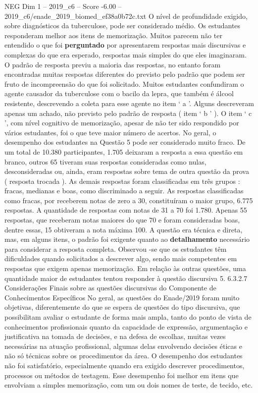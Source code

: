 \begin{textsample}{NEG Dim 1 – 2019\_c6 – Score -6.00 – 2019\_c6/enade\_2019\_biomed\_ef38a0b72c.txt}
O nível de profundidade exigido, sobre diagnósticos da tuberculose, pode ser considerado médio.
Os estudantes responderam melhor aos itens de memorização.
Muitos parecem não ter entendido o que foi \textbf{perguntado} por apresentarem respostas mais discursivas e complexas do que era esperado, respostas mais simples do que eles imaginaram.
O padrão de resposta previu a maioria das respostas, no entanto foram encontradas muitas respostas diferentes do previsto pelo padrão que podem ser fruto de incompreensão do que foi solicitado.
Muitos estudantes confundiram o agente causador da tuberculose com o bacilo da lepra, que também é álcool resistente, descrevendo a coleta para esse agente no item ‘ a ’.
Alguns descreveram apenas um achado, não previsto pelo padrão de resposta ( item ‘ b ’ ).
O item ‘ c ’, com nível cognitivo de memorização, apesar de não ter sido respondido por vários estudantes, foi o que teve maior número de acertos.
No geral, o desempenho dos estudantes na Questão 5 pode ser considerado muito fraco.
De um total de 10.380 participantes, 1.705 deixaram a resposta a essa questão em branco, outros 65 tiveram suas respostas consideradas como nulas, desconsideradas ou, ainda, eram respostas sobre tema de outra questão da prova ( resposta trocada ).
As demais respostas foram classificadas em três grupos : fracas, medianas e boas, como discriminado a seguir.
As respostas classificadas como fracas, por receberem notas de zero a 30, constituíram o maior grupo, 6.775 respostas.
A quantidade de respostas com notas de 31 a 70 foi 1.780.
Apenas 55 respostas, que receberam notas maiores do que 70 e foram consideradas boas, dentre essas, 15 obtiveram a nota máxima 100.
A questão era técnica e direta, mas, em alguns itens, o padrão foi exigente quanto ao \textbf{detalhamento} necessário para considerar a resposta completa.
Observou -se que os estudantes têm dificuldades quando solicitados a descrever algo, sendo mais competentes em respostas que exigem apenas memorização.
Em relação às outras questões, uma quantidade maior de estudantes tentou responder à questão discursiva 5. 6.3.2.7 Considerações Finais sobre as questões discursivas do Componente de Conhecimentos Específicos No geral, as questões do Enade/2019 foram muito objetivas, diferentemente do que se espera de questões do tipo discursiva, que possibilitam avaliar o estudante de forma mais ampla, tanto do ponto de vista de conhecimentos profissionais quanto da capacidade de expressão, argumentação e justificativa na tomada de decisões, e na defesa de escolhas, muitas vezes necessárias na atuação profissional, algumas delas envolvendo decisões éticas e não só técnicas sobre os procedimentos da área.
O desempenho dos estudantes não foi satisfatório, especialmente quando era exigido descrever procedimentos, processos ou métodos de testagem.
Esse desempenho foi melhor em itens que envolviam a simples memorização, com um ou dois nomes de teste, de tecido, etc.

\end{textsample}
